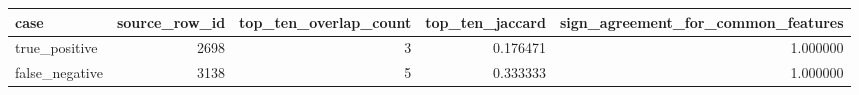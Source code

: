 \begin{tabular}{lrrrr}
\toprule
case & source\_row\_id & top\_ten\_overlap\_count & top\_ten\_jaccard & sign\_agreement\_for\_common\_features \\
\midrule
true\_positive & 2698 & 3 & 0.176471 & 1.000000 \\
false\_negative & 3138 & 5 & 0.333333 & 1.000000 \\
\bottomrule
\end{tabular}
